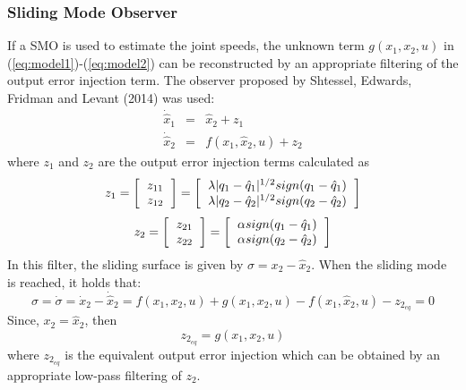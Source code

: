 \documentclass[9pt,spanish,aspectratio=1610]{beamer}
\begin{document}
\begin{frame}\frametitle{Sliding Mode Observer}
  If a SMO is used to estimate the joint speeds, the unknown term $g(x_1, x_2, u)$ in (\ref{eq:model1})-(\ref{eq:model2}) can be reconstructed by an appropriate filtering of the output error injection term. The observer proposed by Shtessel, Edwards, Fridman and Levant (2014) was used:
  \begin{eqnarray}
    \dot{\hat{x}}_1 &=& \hat{x}_2 + z_1\label{eq:observer1}\\
    \dot{\hat{x}}_2 &=& f(x_1, \hat{x}_2, u) + z_2\label{eq:observer2}
  \end{eqnarray}
  where $z_1$ and $z_2$ are the output error injection terms calculated as
  \begin{equation*}z_1 =
    \left[\begin{tabular}{c}
            $z_{11}$\\
            $z_{12}$
    \end{tabular}\right] = 
    \left[\begin{tabular}{c}
      $\lambda\vert q_1 - \hat{q}_1\vert ^{1/2}sign(q_1 - \hat{q}_1)$ \\
      $\lambda\vert q_2 - \hat{q}_2\vert ^{1/2}sign(q_2 - \hat{q}_2)$
    \end{tabular}\right]
\end{equation*}
\begin{equation*}z_2 =
  \left[\begin{tabular}{c}
            $z_{21}$\\
            $z_{22}$
    \end{tabular}\right] = 
  \left[\begin{tabular}{c}
      $\alpha sign(q_1 - \hat{q}_1)$ \\
      $\alpha sign(q_2 - \hat{q}_2)$
    \end{tabular}\right]
\end{equation*}
In this filter, the sliding surface is given by $\sigma = x_2 - \hat{x}_2$. When the sliding mode is reached, it holds that:
\[\sigma = \dot{\sigma} = \dot{x}_2 - \dot{\hat{x}}_2 = f(x_1, x_2, u) + g(x_1, x_2, u) - f(x_1, \hat{x}_2, u) - z_{2_{eq}} = 0\]
Since,  $x_2 = \hat{x}_2$, then
\begin{equation*}
  z_{2_{eq}} = g(x_1, x_2, u)
\end{equation*}
where $z_{2_{eq}}$ is the equivalent output error injection which can be obtained by an appropriate low-pass filtering of $z_2$. 
\end{frame}
\end{document}
